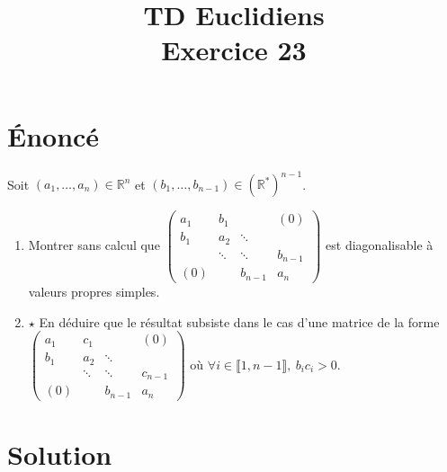 \documentclass[french]{article}
\title{TD Euclidiens\\ Exercice 23}
\date{}
\newcommand{\R}{\mathbb{R}}
\newcommand{\st}{^*}
\begin{document}
\maketitle

\section{Énoncé}
Soit $(a_1,\ldots,a_n)\in\R^n$ et $(b_1,\ldots,b_{n-1})\in(\R\st)^{n-1}$.
\begin{enumerate}
	\item Montrer sans calcul que $\displaystyle\begin{pmatrix}
		a_1&b_1&&(0)\\
		b_1&a_2&\ddots&\\
		&\ddots&\ddots&b_{n-1}\\
		(0)&&b_{n-1}&a_n
	\end{pmatrix}$ est diagonalisable à valeurs propres simples.
	\item $\star$ En déduire que le résultat subsiste dans le cas d'une matrice de la forme $\displaystyle\begin{pmatrix}
		a_1&c_1&&(0)\\
		b_1&a_2&\ddots&\\
		&\ddots&\ddots&c_{n-1}\\
		(0)&&b_{n-1}&a_n
	\end{pmatrix}$ où $\forall i\in\llbracket1,n-1\rrbracket,\ b_ic_i>0$.
\end{enumerate}
\section{Solution}
\end{document}
